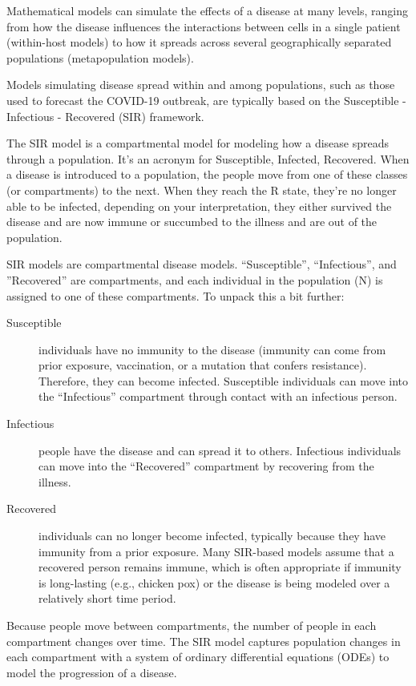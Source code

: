 \documentclass{article}\usepackage[]{graphicx}\usepackage[]{color}
\begin{document}
Mathematical models can simulate the effects of a disease at many levels, ranging from how the disease influences the interactions between cells in a single patient (within-host models) to how it spreads across several geographically separated populations (metapopulation models). 

Models simulating disease spread within and among populations, such as those used to forecast the COVID-19 outbreak, are typically based on the Susceptible - Infectious - Recovered (SIR) framework.

The SIR model is a compartmental model for modeling how a disease spreads through a population. It's an acronym for Susceptible, Infected, Recovered. When a disease is introduced to a population, the people move from one of these classes (or compartments) to the next. When they reach the R state, they're no longer able to be infected, depending on your interpretation, they either survived the disease and are now immune or succumbed to the illness and are out of the population.



SIR models are compartmental disease models. ``Susceptible'', ``Infectious'', and ''Recovered'' are compartments, and each individual in the population (N) is assigned to one of these compartments. To unpack this a bit further:

\begin{description}
  \item[Susceptible] individuals have no immunity to the disease (immunity can come from prior exposure, vaccination, or a mutation that confers resistance). Therefore, they can become infected. Susceptible individuals can move into the ``Infectious'' compartment through contact with an infectious person.
  \item[Infectious] people have the disease and can spread it to others. Infectious individuals can move into the ``Recovered'' compartment by recovering from the illness.
  \item[Recovered] individuals can no longer become infected, typically because they have immunity from a prior exposure. Many SIR-based models assume that a recovered person remains immune, which is often appropriate if immunity is long-lasting (e.g., chicken pox) or the disease is being modeled over a relatively short time period.
\end{description}

Because people move between compartments, the number of people in each compartment changes over time. The SIR model captures population changes in each compartment with a system of ordinary differential equations (ODEs) to model the progression of a disease.
\end{document}
